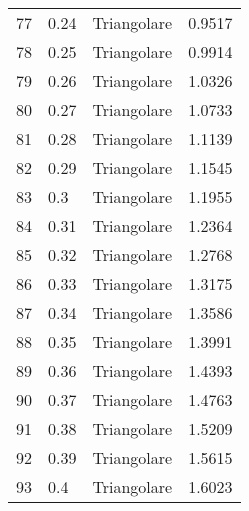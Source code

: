 \documentclass[a4paper]{article}
\begin{document}
\begin{center}
\begin{tabular}{|c|llr|}
			77	&	0.24	&	Triangolare	&	0.9517	\\
			78	&	0.25	&	Triangolare	&	0.9914	\\
			79	&	0.26	&	Triangolare	&	1.0326	\\
			80	&	0.27	&	Triangolare	&	1.0733	\\
			81	&	0.28	&	Triangolare	&	1.1139	\\
			82	&	0.29	&	Triangolare	&	1.1545	\\
			83	&	0.3	&	Triangolare	&	1.1955	\\
			84	&	0.31	&	Triangolare	&	1.2364	\\
			85	&	0.32	&	Triangolare	&	1.2768	\\
			86	&	0.33	&	Triangolare	&	1.3175	\\
			87	&	0.34	&	Triangolare	&	1.3586	\\
			88	&	0.35	&	Triangolare	&	1.3991	\\
			89	&	0.36	&	Triangolare	&	1.4393	\\
			90	&	0.37	&	Triangolare	&	1.4763	\\
			91	&	0.38	&	Triangolare	&	1.5209	\\
			92	&	0.39	&	Triangolare	&	1.5615	\\
			93	&	0.4	&	Triangolare	&	1.6023	\\
			\bottomrule
		\end{tabular}
	\end{center}




	
	
\end{document}
